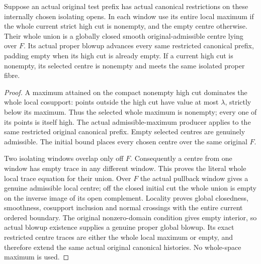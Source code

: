 \begin{theorem}
\label{hir:original-discrete-full-cut-global-refinement}
\leanok
Suppose an actual original test prefix has actual canonical restrictions
on these internally chosen isolating opens. In each window use its entire
local maximum if the whole current strict high cut is nonempty, and the
empty centre otherwise. Their whole union is a globally closed smooth
original-admissible centre lying over $F$. Its actual proper blowup advances
every same restricted canonical prefix, padding empty when its high cut is
already empty. If a current high cut is nonempty, its selected centre is
nonempty and meets the same isolated proper fibre.
\end{theorem}
\begin{proof}
A maximum attained on the compact nonempty high cut dominates the whole
local cosupport: points outside the high cut have value at most $\lambda$,
strictly below its maximum. Thus the selected whole maximum is nonempty;
every one of its points is itself high. The actual admissible-maximum
producer applies to the same restricted original canonical prefix. Empty
selected centres are genuinely admissible. The initial bound places every
chosen centre over the same original $F$.

Two isolating windows overlap only off $F$. Consequently a centre from one
window has empty trace in any different window. This proves the literal
whole local trace equation for their union. Over $F$ the actual pullback
window gives a genuine admissible local centre; off the closed initial cut
the whole union is empty on the inverse image of its open complement.
Locality proves global closedness, smoothness, cosupport inclusion and
normal crossings with the entire current ordered boundary. The original
nonzero-domain condition gives empty interior, so actual blowup existence
supplies a genuine proper global blowup. Its exact restricted centre traces
are either the whole local maximum or empty, and therefore extend the same
actual original canonical histories. No whole-space maximum is used.
\end{proof}
